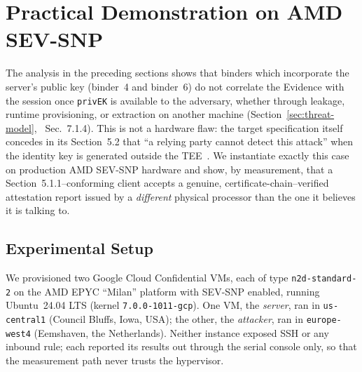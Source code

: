 
\section{Practical Demonstration on AMD SEV-SNP}
\label{sec:sev-snp-demo}

The analysis in the preceding sections shows that binders which incorporate the
server's public key (binder~4 and binder~6) do not correlate the Evidence with
the session once \texttt{privEK} is available to the adversary, whether through
leakage, runtime provisioning, or extraction on another machine
(Section~\ref{sec:threat-model}, \paper{}~Sec.~7.1.4). This is not a hardware
flaw: the target specification itself concedes in its Section~5.2 that ``a
relying party cannot detect this attack'' when the identity key is generated
outside the TEE~\spec{}. We instantiate exactly this case on production AMD
SEV-SNP hardware and show, by measurement, that a Section~5.1.1--conforming
client accepts a genuine, certificate-chain--verified attestation report issued
by a \emph{different} physical processor than the one it believes it is talking
to.

\subsection{Experimental Setup}
\label{sec:sev-snp-setup}

We provisioned two Google Cloud Confidential VMs, each of type
\texttt{n2d-standard-2} on the AMD EPYC ``Milan'' platform with SEV-SNP enabled,
running Ubuntu~24.04 LTS (kernel \texttt{7.0.0-1011-gcp}). One VM, the
\emph{server}, ran in \texttt{us-central1} (Council Bluffs, Iowa, USA); the
other, the \emph{attacker}, ran in \texttt{europe-west4} (Eemshaven, the
Netherlands). Neither instance exposed SSH or any inbound rule; each reported
its results out through the serial console only, so that the measurement path
never trusts the hypervisor.

